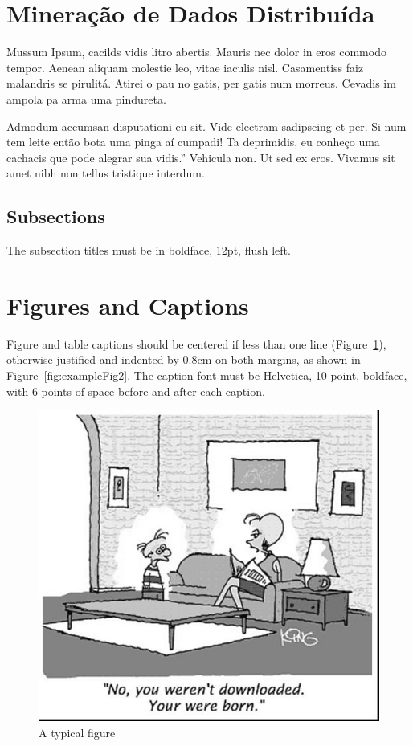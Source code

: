 \documentclass[12pt]{article}
\begin{document}
\section{Mineração de Dados Distribuída} \label{MDD}

Mussum Ipsum, cacilds vidis litro abertis. Mauris nec dolor in eros commodo tempor. Aenean aliquam molestie leo, vitae iaculis nisl. Casamentiss faiz malandris se pirulitá. Atirei o pau no gatis, per gatis num morreus. Cevadis im ampola pa arma uma pindureta.

Admodum accumsan disputationi eu sit. Vide electram sadipscing et per. Si num tem leite então bota uma pinga aí cumpadi! Ta deprimidis, eu conheço uma cachacis que pode alegrar sua vidis.” Vehicula non. Ut sed ex eros. Vivamus sit amet nibh non tellus tristique interdum.


\subsection{Subsections}

The subsection titles must be in boldface, 12pt, flush left.

\section{Figures and Captions}\label{sec:figs}

Figure and table captions should be centered if less than one line
(Figure~\ref{fig:exampleFig1}), otherwise justified and indented by 0.8cm on
both margins, as shown in Figure~\ref{fig:exampleFig2}. The caption font must
be Helvetica, 10 point, boldface, with 6 points of space before and after each
caption.

\begin{figure}[ht]
\centering
\includegraphics[width=.5\textwidth]{fig1.jpg}
\caption{A typical figure}
\label{fig:exampleFig1}
\end{figure}
\end{document}
